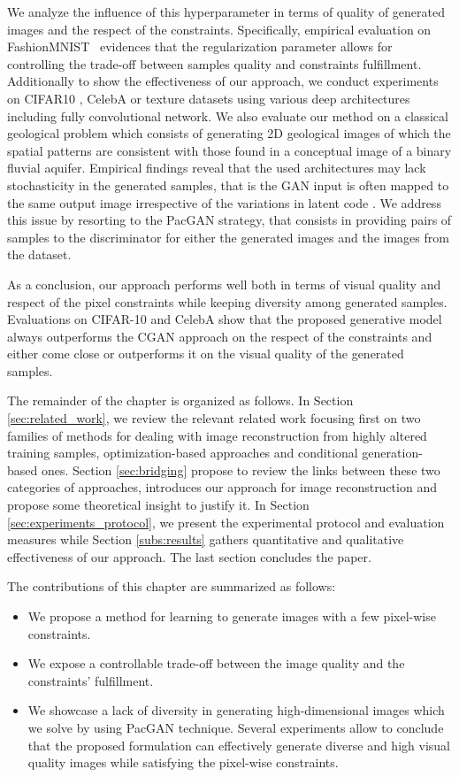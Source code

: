  We analyze the influence of this hyperparameter in terms of quality of generated images and the respect of the constraints. Specifically, empirical evaluation on FashionMNIST~\citep{Xiao2017} evidences that the regularization parameter allows for controlling the trade-off between samples quality and constraints fulfillment. 
Additionally to show the effectiveness of our approach, we conduct experiments on CIFAR10 \citep{Krizhevsky2009}, CelebA \citep{Liu2015} or texture \citep{Jetchev2017} datasets using various deep architectures including fully convolutional network. We also evaluate our method on a classical geological problem which consists of generating 2D geological images of which the spatial patterns are consistent with those found in a conceptual image of a binary fluvial aquifer\citep{Strebelle2002}\citep{Laloy2018}. Empirical findings reveal that the used architectures may lack stochasticity in the generated samples, that is the GAN input is often mapped to the same output image irrespective of the variations in latent code \citep{Yang2019}. We address this issue by resorting to the PacGAN \citep{Lin2018} strategy, that consists in providing pairs of samples to the discriminator for either the generated images and the images from the dataset.

As a conclusion, our approach performs well both in terms of visual quality and respect of the pixel constraints while keeping diversity among generated samples. Evaluations on CIFAR-10 and CelebA show that the proposed generative model always outperforms the CGAN approach on the respect of the constraints and either come close or outperforms it on the visual quality of the generated samples.

The remainder of the chapter is organized as follows. In Section \ref{sec:related_work}, we review the relevant related  work focusing first on two families of methods for dealing with image reconstruction from highly altered training samples, optimization-based approaches and conditional generation-based ones. Section \ref{sec:bridging} propose to review the links between these two categories of approaches, introduces our approach for image reconstruction and propose some theoretical insight to justify it. In Section \ref{sec:experiments_protocol}, we present the experimental protocol and evaluation measures while Section \ref{subs:results} gathers quantitative and qualitative effectiveness of our approach. The last section concludes the paper.

The contributions of this chapter are summarized as follows:
\begin{itemize}[nosep]
	\item We propose a method for learning to generate images with a few pixel-wise constraints.
	\item We expose a controllable trade-off between the image quality and the constraints' fulfillment.
	\item We showcase a lack of diversity in generating high-dimensional images which we solve by using  PacGAN\citep{Lin2018} technique. Several experiments allow to conclude that the proposed formulation can effectively generate diverse and high visual quality images while satisfying the pixel-wise constraints. 
\end{itemize}

